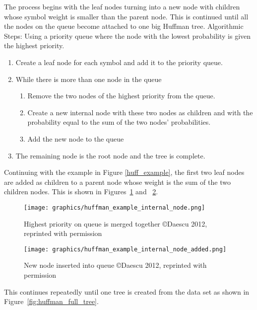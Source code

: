 \documentclass[letterpaper, 12pt]{article}
\begin{document}
The process begins with the leaf nodes turning into a new node with children whose symbol weight is smaller than
the parent node. This is continued until all the nodes on the queue become attached to one big Huffman tree.
Algorithmic Steps:
Using a priority queue where the node with the lowest probability is given the highest priority.
\begin{enumerate}
 \item Create a leaf node for each symbol and add it to the priority queue.
 \item While there is more than one node in the queue
 \begin{enumerate}
    \item Remove the two nodes of the highest priority from the queue.
    \item Create a new internal node with these two nodes as children and with the probability equal to
	  the sum of the two nodes' probabilities.
    \item Add the new node to the queue
  \end{enumerate}
  \item The remaining node is the root node and the tree is complete.
\end{enumerate}

Continuing with the example in Figure \ref{huff_example}, the first two leaf nodes are added as children to a parent node whose
weight is the sum of the two children nodes. This is shown in Figures~\ref{fig:huffman_ex_int_1} and
~\ref{fig:huffman_ex_int_2}.
\par\vspace{\baselineskip}

\begin{figure}
  \centering
  \texttt{[image: graphics/huffman\_example\_internal\_node.png]}
  \cite{huffman}
  \caption{Highest priority on queue is merged together  \copyright Daescu 2012, reprinted with permission}
  \label{fig:huffman_ex_int_1}
\end{figure}

\begin{figure}
  \centering
  \texttt{[image: graphics/huffman\_example\_internal\_node\_added.png]}
  \cite{huffman}
  \caption{New node inserted into queue  \copyright Daescu 2012, reprinted with permission}
  \label{fig:huffman_ex_int_2}
\end{figure}

This continues repeatedly until one tree is created from the data set as shown in Figure~\ref{fig:huffman_full_tree}.
\par\vspace{\baselineskip}
\end{document}
